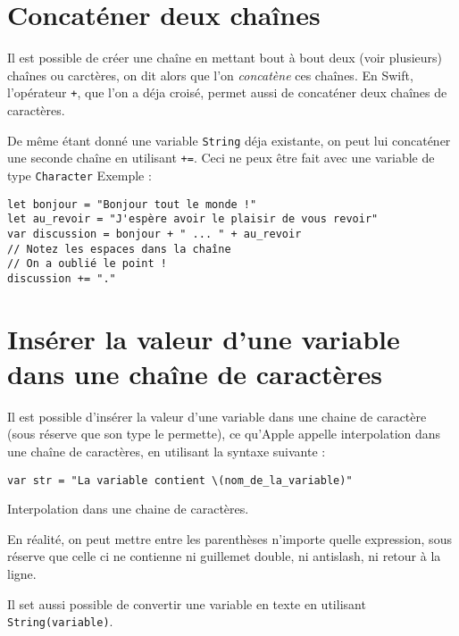 \section{Concaténer deux chaînes}
Il est possible de créer une chaîne en mettant bout à bout deux (voir plusieurs) chaînes ou carctères, on dit alors que l'on \emph{concatène} ces chaînes. En Swift, l'opérateur \verb"+", que l'on a déja croisé, permet aussi de concaténer deux chaînes de caractères.

De même étant donné une variable \texttt{String} déja existante, on peut lui concaténer une seconde chaîne en utilisant \verb"+=".
Ceci ne peux être fait avec une variable de type \texttt{Character}
Exemple :
\begin{listing}[h]
\begin{verbatim}
let bonjour = "Bonjour tout le monde !"
let au_revoir = "J'espère avoir le plaisir de vous revoir"
var discussion = bonjour + " ... " + au_revoir
// Notez les espaces dans la chaîne
// On a oublié le point !
discussion += "."
\end{verbatim}
\end{listing}
\section{Insérer la valeur d'une variable dans une chaîne de caractères}
Il est possible d'insérer la valeur d'une variable dans une chaine de caractère (sous réserve que son type le permette), ce qu'Apple appelle interpolation dans une chaîne de caractères, en utilisant la syntaxe suivante :
\begin{listing}[h]
\begin{verbatim}
var str = "La variable contient \(nom_de_la_variable)"
\end{verbatim}
\caption{Interpolation dans une chaine de caractères.}
\end{listing}%
En réalité, on peut mettre entre les parenthèses n'importe quelle expression, sous réserve que celle ci ne contienne ni guillemet double, ni antislash, ni retour à la ligne.

Il set aussi possible de convertir une variable en texte en utilisant \texttt{String(variable)}.
